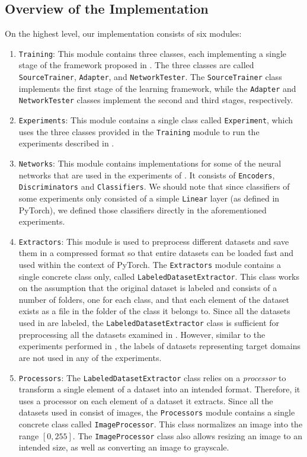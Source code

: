 \documentclass[14pt]{extarticle}
\begin{document}
		\subsection{Overview of the Implementation}
		On the highest level, our implementation consists of six modules:
		\begin{enumerate}
			\item \texttt{Training}: This module contains three classes, each implementing a single stage of the framework proposed in \cite{adda}. The three classes are called \texttt{SourceTrainer}, \texttt{Adapter}, and \texttt{NetworkTester}. The \texttt{SourceTrainer} class implements the first stage of the learning framework, while the \texttt{Adapter} and \texttt{NetworkTester} classes implement the second and third stages, respectively.
			\item \texttt{Experiments}: This module contains a single class called \texttt{Experiment}, which uses the three classes provided in the \texttt{Training} module to run the experiments described in \cite{adda}.
			\item \texttt{Networks}: This module contains implementations for some of the neural networks that are used in the experiments of \cite{adda}. It consists of \texttt{Encoders}, \texttt{Discriminators} and \texttt{Classifiers}. We should note that since classifiers of some experiments only consisted of a simple \texttt{Linear} layer (as defined in PyTorch), we defined those classifiers directly in the aforementioned experiments.
			\item \texttt{Extractors}: This module is used to preprocess different datasets and save them in a compressed format so that entire datasets can be loaded fast and used within the context of PyTorch. The \texttt{Extractors} module contains a single concrete class only, called \texttt{LabeledDatasetExtractor}. This class works on the assumption that the original dataset is labeled and consists of a number of folders, one for each class, and that each element of the dataset exists as a file in the folder of the class it belongs to. Since all the datasets used in \cite{adda} are labeled, the \texttt{LabeledDatasetExtractor} class is sufficient for preprocessing all the datasets examined in \cite{adda}. However, similar to the experiments performed in \cite{adda}, the labels of datasets representing target domains are not used in any of the experiments.
			\item \texttt{Processors}: The \texttt{LabeledDatasetExtractor} class relies on a \textit{processor} to transform a single element of a dataset into an intended format. Therefore, it uses a processor on each element of a dataset it extracts. Since all the datasets used in \cite{adda} consist of images, the \texttt{Processors} module contains a single concrete class called \texttt{ImageProcessor}. This class normalizes an image into the range $[0, 255]$. The \texttt{ImageProcessor} class also allows resizing an image to an intended size, as well as converting an image to grayscale.

\end{enumerate}
\end{document}
